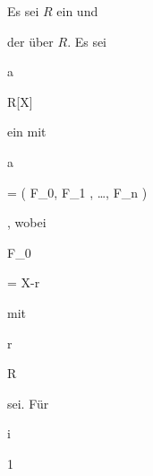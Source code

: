 {} {}




{}


{


Es sei $R$ ein
und


 der
über $R$. Es sei


\mavergleichskette


{\vergleichskette


{ {\mathfrak a}
}


{ \subseteq }{ R[X]
}


{  }{
}


{    }{
}


{   }{
}


}
{}{}{}
ein
mit


\mavergleichskettedisp


{\vergleichskette


{ {\mathfrak a}
}


{ =} { \left(  F_0, F_1 , \ldots , F_n  \right)
}


{ } {
}


{ } {
}


{ } {
}


}
{}{}{,}
wobei


\mavergleichskette


{\vergleichskette


{F_0
}


{ = }{ X-r
}


{  }{
}


{    }{
}


{   }{
}


}
{}{}{}
mit


\mavergleichskette


{\vergleichskette


{ r
}


{ \in }{ R
}


{  }{
}


{    }{
}


{   }{
}


}
{}{}{}
sei. Für


\mavergleichskette


{\vergleichskette


{ i
}


{ \geq }{ 1
}


{  }{
}


{    }{
}


}}
